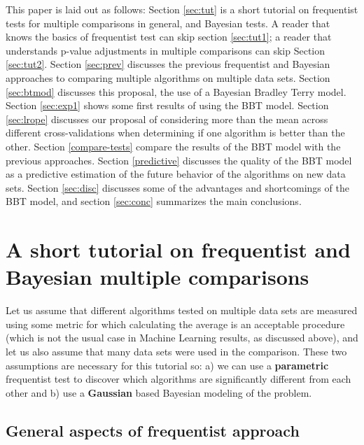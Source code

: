 \documentclass[twoside,11pt,preprint]{article}
\begin{document}
This paper is laid out as follows: Section \ref{sec:tut} is a short
tutorial on frequentist tests for multiple comparisons in general, and
Bayesian tests. A reader that knows the basics of frequentist test can
skip section \ref{sec:tut1}; a reader that understands p-value
adjustments in multiple comparisons can skip Section \ref{sec:tut2}. Section \ref{sec:prev}
discusses the previous frequentist and Bayesian approaches to
comparing multiple algorithms on multiple data sets. Section
\ref{sec:btmod} discusses this proposal, the use of a Bayesian Bradley
Terry model. Section \ref{sec:exp1} shows some first results of using
the BBT model. Section \ref{sec:lrope} discusses our proposal of
considering more than the mean across different cross-validations when
determining if one algorithm is better than the other. Section
\ref{compare-tests} compare the results of the BBT model with the
previous approaches. Section \ref{predictive} discusses the quality of
the BBT model as a predictive estimation of the future behavior of the
algorithms on new data sets. Section \ref{sec:disc} discusses some of
the advantages and shortcomings of the BBT model, and section
\ref{sec:conc} summarizes the main conclusions.

\hypertarget{a-short-tutorial-on-frequentist-and-bayesian-multiple-comparisons}{%
\section{\texorpdfstring{A short tutorial on frequentist and Bayesian multiple comparisons \label{sec:tut}}{A short tutorial on frequentist and Bayesian multiple comparisons }}\label{a-short-tutorial-on-frequentist-and-bayesian-multiple-comparisons}}

Let us assume that different algorithms tested on multiple data sets
are measured using some metric for which calculating the average is an
acceptable procedure (which is not the usual case in Machine Learning
results, as discussed above), and let us also assume that many data sets
were used in the comparison. These two assumptions are necessary for
this tutorial so: a) we can use a \textbf{parametric} frequentist test to
discover which algorithms are significantly different from each other
and b) use a \textbf{Gaussian} based Bayesian modeling of the problem.

\hypertarget{general-aspects-of-frequentist-approach}{%
\subsection{\texorpdfstring{General aspects of frequentist approach \label{sec:tut1}}{General aspects of frequentist approach }}\label{general-aspects-of-frequentist-approach}}
\end{document}
